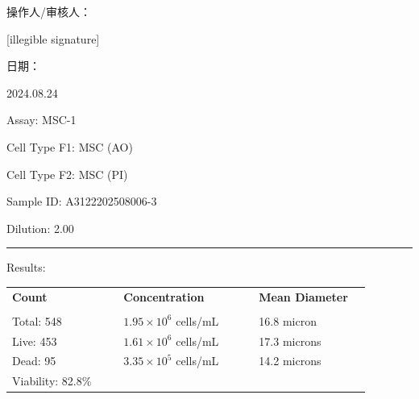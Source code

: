 \documentclass[UTF8,10pt,a4paper,fontset=fandol]{ctexart}
\newcommand{\fieldvalue}[1]{#1}
\newcommand{\handwritten}[1]{#1}
\begin{document}
\vfill

\noindent
操作人/审核人：

\fieldvalue{\handwritten{[illegible signature]}}

\hfill
日期：

\fieldvalue{\handwritten{2024.08.24}}

\newpage

\noindent Assay: 
\fieldvalue{MSC-1}

\medskip
\noindent Cell Type F1: 
\fieldvalue{MSC (AO)}

\noindent Cell Type F2: 
\fieldvalue{MSC (PI)}

\medskip
\noindent Sample ID: 
\fieldvalue{A3122202508006-3}

\noindent Dilution: 
\fieldvalue{2.00}

\medskip
\noindent\rule{\linewidth}{0.4pt}

\noindent Results:

\medskip
\begin{tabular}{@{}p{0.29\linewidth}p{0.34\linewidth}p{0.29\linewidth}@{}}
\textbf{Count} & \textbf{Concentration} & \textbf{Mean Diameter} \\[-2pt]
\underline{\hspace{0.9\linewidth}} &
\underline{\hspace{0.9\linewidth}} &
\underline{\hspace{0.9\linewidth}} \\[2pt]
Total:
\fieldvalue{548}
&
\fieldvalue{$1.95\times 10^{6}$ cells/mL}
&
\fieldvalue{16.8 micron}
\\
Live:
\fieldvalue{453}
&
\fieldvalue{$1.61\times 10^{6}$ cells/mL}
&
\fieldvalue{17.3 microns}
\\
Dead:
\fieldvalue{95}
&
\fieldvalue{$3.35\times 10^{5}$ cells/mL}
&
\fieldvalue{14.2 microns}
\\
Viability:
\fieldvalue{82.8\%}
&
&
\end{tabular}
\end{document}
